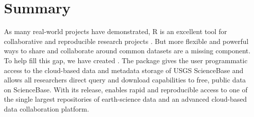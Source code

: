 \section{Summary}

As many real-world projects have demonstrated, R is
an excellent tool for collaborative and reproducible
research projects \citep{Gandrud213}. But more flexible and powerful
ways to share and collaborate around common datasets
are a missing component. To help fill this gap, we
have created . The  package
gives the user programmatic access to the
cloud-based data and metadata storage of USGS ScienceBase
and allows all researchers direct query and download
capabilities to free, public data on ScienceBase.
With its release,  enables rapid and reproducible
access to one of the single
largest repositories of earth-science data and an advanced
cloud-based data collaboration platform.

